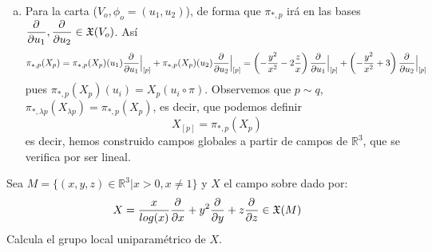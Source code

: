 \begin{sol}
    \begin{enumerate}[a)]
        \item Para la carta ($V_o,\phi_o=(u_1,u_2)$), de forma que $\pi_{*,p}$ ir\'a en las bases $\dfrac{\partial^{} }{\partial u_1}, \dfrac{\partial^{} }{\partial u_2} \in \mathfrak X(V_o)$. As\'i
        $$\pi_{*,p}(X_p) = \pi_{*,p}(X_p)(u_1) \dfrac{\partial^{} }{\partial u_1}\Big|_{[p]} + \pi_{*,p}(X_p)(u_2) \dfrac{\partial^{} }{\partial u_2}\Big|_{[p]} = \left(-\frac{y^2}{x^2}-2\frac{z}{x} \right) \dfrac{\partial^{} }{\partial u_1}\Big|_{[p]}+\left( -\frac{y^2}{x^2}+3\right) \dfrac{\partial^{} }{\partial u_2}\Big|_{[p]}$$
        pues $ \pi_{*,p}(X_p)(u_i) = X_p(u_i\circ \pi)$. Observemos que $p\sim q$, $\pi_{*,\lambda p}(X_{\lambda p})= \pi_{*,p} (X_p)$, es decir, que podemos definir
        $$X_{[p]} = \pi_{*,p} (X_p)$$
        es decir, hemos construido campos globales a partir de campos de $\mathbb R^3$, que se verifica por ser lineal.
    \end{enumerate}
\end{sol}
\begin{ejer}
    [4.19] Sea $M = \{(x, y, z) \in \mathbb R^3 | x > 0, x \neq  1\}$ y $X$ el campo sobre dado por:
    $$X=\dfrac{x}{log(x)} \dfrac{\partial^{} }{\partial x}+y^2\dfrac{\partial^{} }{\partial y}+z\dfrac{\partial^{} }{\partial z} \in \mathfrak X(M)$$ Calcula el grupo local uniparam\'etrico de $X$.
 \end{ejer}
